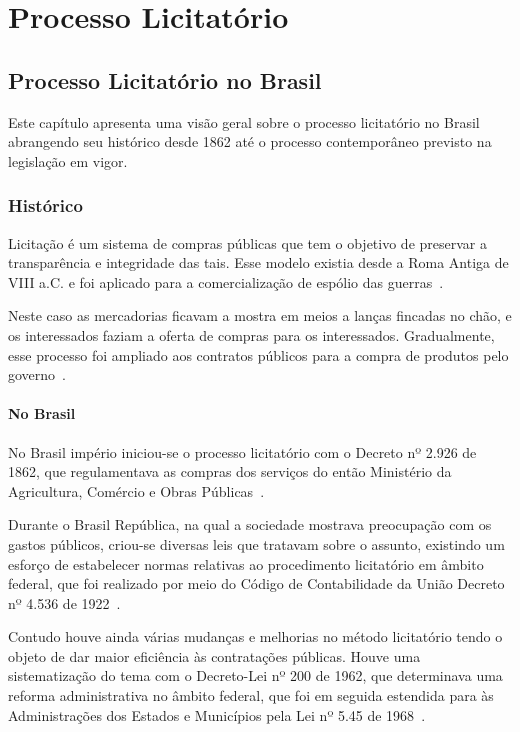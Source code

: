 \part{Processo Licitatório}

\chapter[Processo Licitatório no Brasil]{Processo Licitatório no Brasil}\label{Capitulo1}

Este capítulo apresenta uma visão geral sobre o processo licitatório no Brasil abrangendo seu histórico desde 1862 até o processo contemporâneo previsto na legislação em vigor.

\section{Histórico}

Licitação é um sistema de compras públicas que tem o objetivo de preservar a transparência e integridade das tais.
Esse modelo existia desde a Roma Antiga de VIII a.C. e foi aplicado para a comercialização de espólio das guerras~\cite{prestes2004guia}. 

Neste caso as mercadorias ficavam a mostra em meios a lanças fincadas no chão, e os interessados faziam a oferta de compras para os interessados. 
Gradualmente, esse processo foi ampliado aos contratos públicos para a compra de produtos pelo governo~\cite{prestes2004guia}.

\subsection{No Brasil}

No Brasil império iniciou-se o processo licitatório com o Decreto nº 2.926 de 1862, que regulamentava as compras dos serviços do então Ministério da Agricultura, Comércio e Obras Públicas~\cite{de8processo}. 

Durante o Brasil República, na qual a sociedade mostrava preocupação com os gastos públicos, criou-se diversas leis que tratavam sobre o assunto, existindo um esforço de estabelecer normas relativas ao procedimento licitatório em âmbito federal, que foi realizado por meio do Código de Contabilidade da União Decreto nº 4.536 de 1922~\cite{oliveira2013}.

Contudo houve ainda várias mudanças e melhorias no método licitatório tendo o objeto de dar maior eficiência às contratações públicas.
Houve uma sistematização do tema com o Decreto-Lei nº 200 de 1962, que determinava uma reforma administrativa no âmbito federal, que foi em seguida estendida para às Administrações dos Estados e Municípios pela Lei nº 5.45 de 1968~\cite{ribeiro2007evoluccao}.

